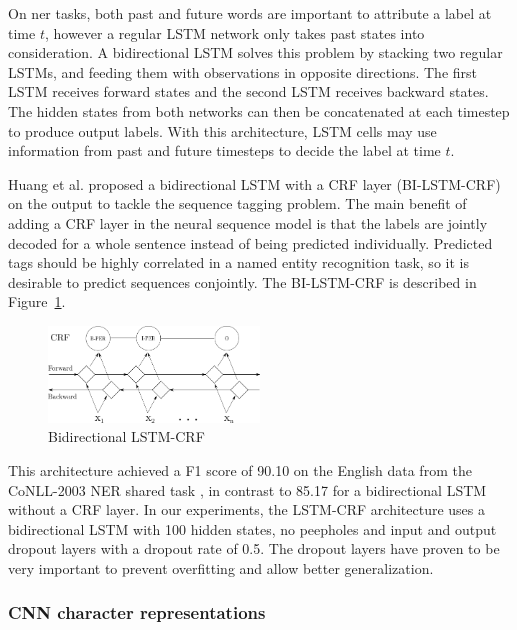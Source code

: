 \documentclass{nle}
\begin{document}
On \gls{ner} tasks, both past and future words are important 
to attribute a label at time $ t $, however a regular LSTM network only takes 
past states into consideration. A bidirectional LSTM solves this problem by stacking 
two regular LSTMs, and feeding them with observations in opposite directions. The first LSTM 
receives forward states and the second LSTM receives backward states. The hidden states from both 
networks can then be concatenated at each timestep to produce output labels. With this 
architecture, LSTM cells may use information from past and future timesteps to decide 
the label at time $ t $.

Huang et al.  proposed a bidirectional LSTM with a CRF layer (BI-LSTM-CRF) on 
the output to tackle the sequence tagging problem. The main benefit of adding a CRF layer 
in the neural sequence model is that the labels are jointly decoded for a whole sentence 
instead of being predicted individually. 
Predicted tags should be highly correlated 
in a named entity recognition task, so it is desirable to predict sequences conjointly.
The BI-LSTM-CRF is described in Figure~\ref{fig:bi_lstm_crf}.

\begin{figure}[h]
  \centering
  \includegraphics[width=0.5\textwidth]{pics/bi_lstm_crf}
  \caption{Bidirectional LSTM-CRF}
  \label{fig:bi_lstm_crf}
\end{figure}

This architecture achieved a F1 score of 90.10 on the English data from the CoNLL-2003 
NER shared task \cite{KimSang2003}, in contrast to 85.17 for a bidirectional LSTM without 
a CRF layer. 
In our experiments, the LSTM-CRF architecture uses a bidirectional LSTM with 100 
hidden states, no peepholes and input and output dropout layers with a dropout
rate of 0.5. The dropout layers have proven to be very important to prevent overfitting 
and allow better generalization.

\subsubsection{CNN character representations}
\label{sssec:lstm_crf_cnn}
\end{document}
